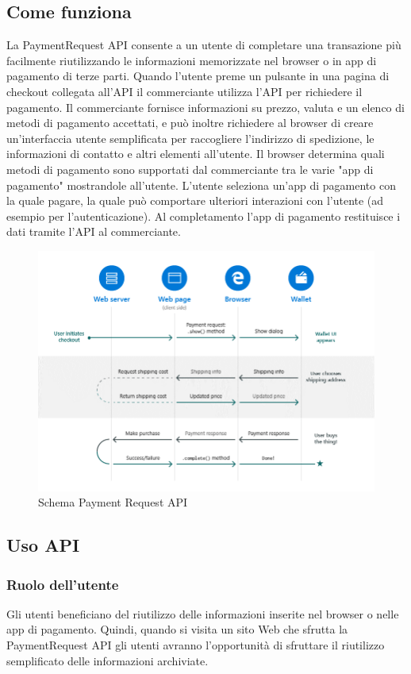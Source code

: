 \documentclass[11pt ,a4paper , twoside , openright ]{article}
\begin{document}
	\subsection{Come funziona}	
	La PaymentRequest API consente a un utente di completare una transazione più facilmente riutilizzando le informazioni memorizzate nel browser o in app di pagamento di terze parti.
	Quando l'utente preme un pulsante in una pagina di checkout collegata all'API il commerciante utilizza l'API per richiedere il pagamento. Il commerciante fornisce informazioni su prezzo, valuta e un elenco di metodi di pagamento accettati, e può inoltre richiedere al browser di creare un'interfaccia utente semplificata per raccogliere l'indirizzo di spedizione, le informazioni di contatto e altri elementi all'utente.
	Il browser determina quali metodi di pagamento sono supportati dal commerciante tra le varie "app di pagamento" mostrandole all'utente. 
	L'utente seleziona un'app di pagamento con la quale pagare, la quale può comportare ulteriori interazioni con l'utente (ad esempio per l'autenticazione). 
	Al completamento l'app di pagamento restituisce i dati tramite l'API al commerciante.

	\begin{figure}[h]
		\centering
		\includegraphics[width=1\linewidth]{SchemaPayment}
		\caption{Schema Payment Request API}
		\label{fig:Schema Payment}
	\end{figure}
	\pagebreak
	
	\subsection{Uso API}
	\subsubsection{Ruolo dell'utente}
	Gli utenti beneficiano del riutilizzo delle informazioni inserite nel browser o nelle app di pagamento. Quindi, quando si visita un sito Web che sfrutta la PaymentRequest API gli utenti avranno l'opportunità di sfruttare il riutilizzo semplificato delle informazioni archiviate.
\end{document}
